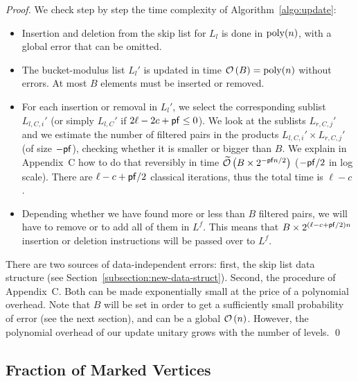 \begin{proof}
We check step by step the time complexity of Algorithm~\ref{algo:update}:
\begin{itemize}
\item Insertion and deletion from the skip list for $L_l$ is done in $\operatorname{poly}(n)$, with a global error that can be omitted.
\item The bucket-modulus list $L_l'$ is updated in time $\mathcal{O} \left(B \right) = \operatorname{poly}(n)$ without errors. At most $B$ elements must be inserted or removed.
\item For each insertion or removal in $L_l'$, we select the corresponding sublist $L_{l,C,i}'$ (or simply $L_{l,C}'$ if $2\ell - 2c + \mathsf{pf} \leq 0$). We look at the sublists $L_{r,C,j}'$ and we estimate the number of filtered pairs in the products $L_{l,C,i}' \times L_{r,C,j}'$ (of size $-\mathsf{pf}$), checking whether it is smaller or bigger than $B$. We explain in \ifeprint Appendix~C\else \cite[Appendix~C]{DBLP:journals/iacr/BonnetainBSS20} \fi how to do that reversibly in time $\widetilde{\mathcal{O}} \left(B \times 2^{-\mathsf{pf} n/2} \right)$ ($-\mathsf{pf}/2$ in log scale).
There are $\ell-c + \mathsf{pf}/2$ classical iterations, thus the total time is $\ell-c$.
\item Depending whether we have found more or less than $B$ filtered pairs, we will have to remove or to add all of them in $L^f$. This means that $B \times 2^{(\ell-c + \mathsf{pf}/2)n}$ insertion or deletion instructions will be passed over to $L^f$.
\end{itemize}

There are two sources of data-independent errors: first, the skip list data structure (see Section~\ref{subsection:new-data-struct}). Second, the procedure of \ifeprint Appendix~C\else \cite[Appendix~C]{DBLP:journals/iacr/BonnetainBSS20}\fi. Both can be made exponentially small at the price of a polynomial overhead. Note that $B$ will be set in order to get a sufficiently small probability of error (see the next section), and can be a global $\mathcal{O} \left(n \right)$. However, the polynomial overhead of our update unitary grows with the number of levels. \qed
\end{proof}


\subsection{Fraction of Marked Vertices}
\label{subsection:fraction-marked}

